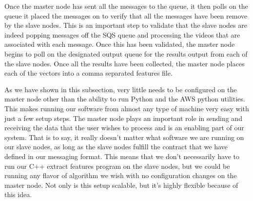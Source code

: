 Once the master node has sent all the messages to the queue, it then polls
on the queue it placed the messages on to verify that all the messages have been
remove by the slave nodes. This is an important step to validate that the
slave nodes are indeed popping messages off the SQS queue and processing
the videos that are associated with each message. Once this has been validated,
the master node begins to poll on the designated output queue for the results output
from each of the slave nodes. Once all the results have been collected, the master
node places each of the vectors into a comma separated features file.
%
%
%
%
%

As we have shown in this subsection, very little needs to be configured on the master
node other than the ability to run Python and the AWS python utilities. This
makes running our software from almost any type of machine very easy with just a
few setup steps. The master node plays an important role in sending and receiving
the data that the user wishes to process and is an enabling part of our system.
That is to say, it really doesn't matter what software we are running on our
slave nodes, as long as the slave nodes fulfill the contract that we have
defined in our messaging format. This means that we don't necessarily have to
run our C++ extract features program on the slave nodes, but we could be running
any flavor of algorithm we wish with no configuration changes on the master node.
Not only is this setup scalable, but it's highly flexible because of this idea.

